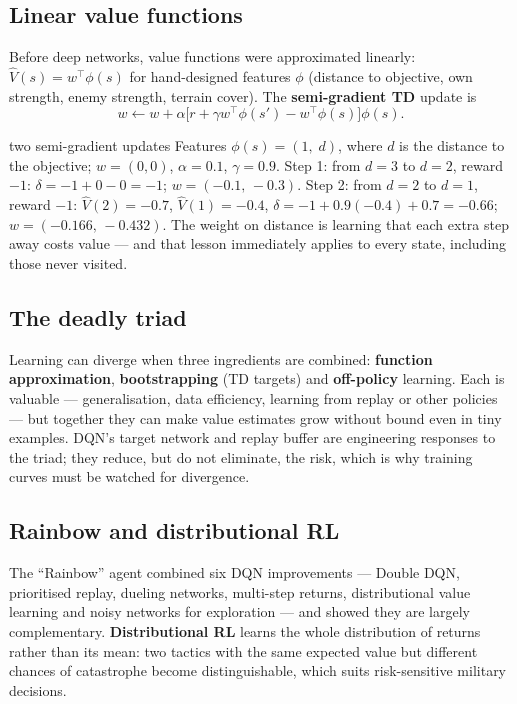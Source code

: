 \documentclass[11pt]{article}
\begin{document}
\subsection{Linear value functions}
Before deep networks, value functions were approximated linearly: $\hat V(s)=w^\top\phi(s)$ for hand-designed features $\phi$ (distance to objective, own strength, enemy strength, terrain cover). The \textbf{semi-gradient TD} update is
\[w\leftarrow w+\alpha\big[r+\gamma w^\top\phi(s')-w^\top\phi(s)\big]\phi(s).\]
\begin{example}{two semi-gradient updates}
Features $\phi(s)=(1,\;d)$, where $d$ is the distance to the objective; $w=(0,0)$, $\alpha=0.1$, $\gamma=0.9$. Step 1: from $d=3$ to $d=2$, reward $-1$: $\delta=-1+0-0=-1$; $w=(-0.1,\,-0.3)$. Step 2: from $d=2$ to $d=1$, reward $-1$: $\hat V(2)=-0.7$, $\hat V(1)=-0.4$, $\delta=-1+0.9(-0.4)+0.7=-0.66$; $w=(-0.166,\,-0.432)$. The weight on distance is learning that each extra step away costs value --- and that lesson immediately applies to every state, including those never visited.
\end{example}
\subsection{The deadly triad}
Learning can diverge when three ingredients are combined: \textbf{function approximation}, \textbf{bootstrapping} (TD targets) and \textbf{off-policy} learning. Each is valuable --- generalisation, data efficiency, learning from replay or other policies --- but together they can make value estimates grow without bound even in tiny examples. DQN's target network and replay buffer are engineering responses to the triad; they reduce, but do not eliminate, the risk, which is why training curves must be watched for divergence.
\subsection{Rainbow and distributional RL}
The ``Rainbow'' agent combined six DQN improvements --- Double DQN, prioritised replay, dueling networks, multi-step returns, distributional value learning and noisy networks for exploration --- and showed they are largely complementary. \textbf{Distributional RL} learns the whole distribution of returns rather than its mean: two tactics with the same expected value but different chances of catastrophe become distinguishable, which suits risk-sensitive military decisions.
\end{document}
